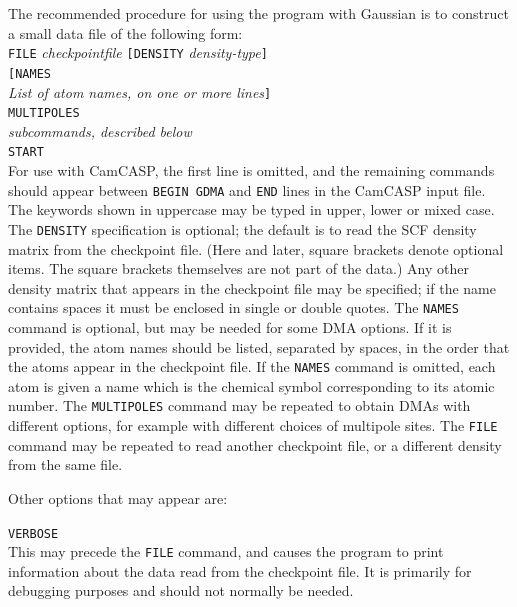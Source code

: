 \documentclass[12pt,txfonts]{paper}
\begin{document}
The recommended procedure for using the program with Gaussian is to
construct a small data file of the following form:\\
\hspace*{2 em}\verb/FILE/ \emph{checkpointfile} %
\verb/[DENSITY/ \emph{density-type}\verb/]/\\
\hspace*{2 em}\verb/[NAMES/\\
\hspace*{2 em}\quad\emph{List of atom names, on one
 or more lines}\verb/]/\\
\hspace*{2 em}\verb/MULTIPOLES/\\
\hspace*{2 em}\quad\emph{subcommands, described below}\\
\hspace*{2 em}\verb/START/\\
For use with {\sc CamCASP}, the first line is omitted, and the
remaining commands should appear between \verb+BEGIN GDMA+ and 
\verb+END+ lines in the {\sc CamCASP} input file. 
The keywords shown in uppercase may be typed in upper, lower or mixed
case. The \verb/DENSITY/ specification is optional; the
default is to read the SCF density matrix from the checkpoint file.
(Here and later, square brackets denote optional items. The square
brackets themselves are not part of the data.)
Any other density matrix that appears in the checkpoint file may be
specified; if the name contains spaces it must be enclosed in single
or double quotes. The \verb/NAMES/
command is optional, but may be needed for some DMA options. If it is
provided, the atom names should be listed, separated by spaces, in the
order that the atoms appear in the checkpoint file. If the
\verb/NAMES/ command is omitted, each atom is given a name which is
the chemical symbol corresponding to its atomic number. The
\verb/MULTIPOLES/ command may be repeated to obtain DMAs with
different options, for example with different choices of multipole
sites. The \verb/FILE/ command may be repeated to read another
checkpoint file, or a different density from the same file.

Other options that may appear are:

\hspace*{2 em}\verb/VERBOSE/\\
This may precede the \verb+FILE+ command, and causes the program to
print information about the data read from the checkpoint file. It is
primarily for debugging purposes and should not normally be needed.
\end{document}
